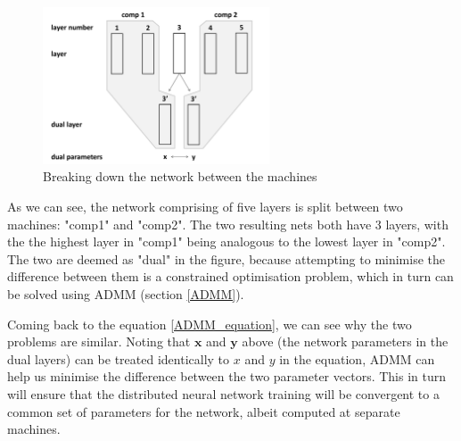 \documentclass[a4paper, 11pt]{article}
\numberwithin{equation}{section}
\begin{document}
		\begin{figure}[!h]
					\centering
					\includegraphics[page=1,width=0.60\textwidth]{dual-training.pdf}
					\caption{\label{fig:dual-training}{Breaking down the network between the machines}}
		\end{figure}
		
		As we can see, the network comprising of five layers is split between two machines: "comp1" and "comp2". The two resulting nets both have 3 layers, with the the highest layer in "comp1" being analogous to the lowest layer in "comp2". The two are deemed as "dual" in the figure, because attempting to minimise the difference between them is a constrained optimisation problem, which in turn can be solved using ADMM (section \ref{ADMM}).
		
		Coming back to the equation \ref{ADMM_equation}, we can see why the two problems are similar. Noting that $\boldsymbol x$ and $\boldsymbol y$ above (the network parameters in the dual layers) can be treated identically to $x$ and $y$ in the equation, ADMM can help us minimise the difference between the two parameter vectors. This in turn will ensure that the distributed neural network training will be convergent to a common set of parameters for the network, albeit computed at separate machines.
		
		\newpage
			
		\clearpage
			
	\newpage
	\pagestyle{plain}
	
	

	
\end{document}
